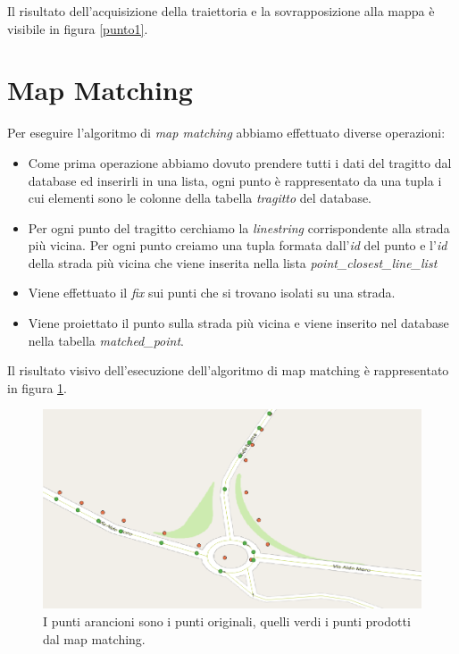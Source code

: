 \documentclass[12pt]{report}
\begin{document}
Il risultato dell'acquisizione della traiettoria e la sovrapposizione alla mappa è visibile in figura \ref{punto1}.

\chapter*{Map Matching}
Per eseguire l'algoritmo di \textit{map matching} abbiamo effettuato diverse operazioni:
\begin{itemize}
	\item Come prima operazione abbiamo dovuto prendere tutti i dati del tragitto dal database ed inserirli in una lista, ogni punto è rappresentato da una tupla i cui elementi sono le colonne della tabella \textit{tragitto} del database. 
	\item Per ogni punto del tragitto cerchiamo la \textit{linestring} corrispondente alla strada più vicina. Per ogni punto creiamo una tupla formata dall'\textit{id} del punto e l'\textit{id} della strada più vicina che viene inserita nella lista \textit{point\_closest\_line\_list} 
	\item Viene effettuato il \textit{fix} sui punti che si trovano isolati su una strada. 
	\item Viene proiettato il punto sulla strada più vicina e viene inserito nel database nella tabella \textit{matched\_point}.
	
\end{itemize}
Il risultato visivo dell'esecuzione dell'algoritmo di map matching è rappresentato in figura \ref{mapmatching}.
\begin{figure}
	\centering
	\includegraphics[scale = 0.43]{figures/mm}
	\caption{I punti arancioni sono i punti originali, quelli verdi i punti prodotti dal map matching.}\label{mapmatching}
\end{figure}
	
\end{document}
